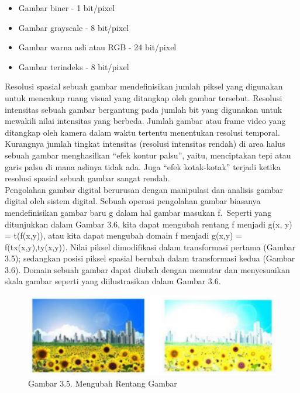 \documentclass[
  letterpaper,
  DIV=11,
  numbers=noendperiod]{scrreprt}
\providecommand{\tightlist}{%
  \setlength{\itemsep}{0pt}\setlength{\parskip}{0pt}}\usepackage{longtable,booktabs,array}
\begin{document}
\begin{itemize}
\tightlist
\item
  Gambar biner - 1 bit/pixel
\item
  Gambar grayscale - 8 bit/pixel
\item
  Gambar warna asli atau RGB - 24 bit/pixel
\item
  Gambar terindeks - 8 bit/pixel
\end{itemize}

Resolusi spasial sebuah gambar mendefinisikan jumlah piksel yang
digunakan untuk mencakup ruang visual yang ditangkap oleh gambar
tersebut. Resolusi intensitas sebuah gambar bergantung pada jumlah bit
yang digunakan untuk mewakili nilai intensitas yang berbeda. Jumlah
gambar atau frame video yang ditangkap oleh kamera dalam waktu tertentu
menentukan resolusi temporal. Kurangnya jumlah tingkat intensitas
(resolusi intensitas rendah) di area halus sebuah gambar menghasilkan
``efek kontur palsu'', yaitu, menciptakan tepi atau garis palsu di mana
aslinya tidak ada. Juga ``efek kotak-kotak'' terjadi ketika resolusi
spasial sebuah gambar sangat rendah.\\
Pengolahan gambar digital berurusan dengan manipulasi dan analisis
gambar digital oleh sistem digital. Sebuah operasi pengolahan gambar
biasanya mendefinisikan gambar baru g dalam hal gambar masukan
f.~Seperti yang ditunjukkan dalam Gambar 3.6, kita dapat mengubah
rentang f menjadi g(x, y) = t(f(x,y)), atau kita dapat mengubah domain f
menjadi g(x,y) = f(tx(x,y),ty(x,y)). Nilai piksel dimodifikasi dalam
transformasi pertama (Gambar 3.5); sedangkan posisi piksel spasial
berubah dalam transformasi kedua (Gambar 3.6). Domain sebuah gambar
dapat diubah dengan memutar dan menyesuaikan skala gambar seperti yang
diilustrasikan dalam Gambar 3.6.

\begin{figure}

{\centering \includegraphics{Asset/image1113.png}

}

\caption{Gambar 3.5. Mengubah Rentang Gambar}

\end{figure}
\end{document}
